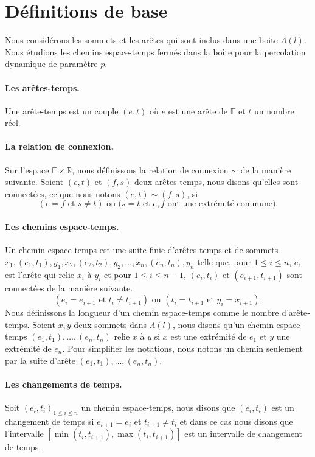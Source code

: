\documentclass[titlepage,a4paper,12pt]{article}
\newcounter{d}
\newcounter{t}
\newcounter{p}
\newcounter{c}
\newcounter{a}
\newcounter{l}
\begin{document}
\section{Définitions de base}
Nous considérons les sommets et les arêtes qui sont inclus dans une boite $\Lambda(l)$. Nous étudions les chemins espace-temps fermés dans la boîte pour la percolation dynamique de paramètre $p$.
\paragraph{Les arêtes-temps.}
Une arête-temps est un couple $(e,t)$ où $e$ est une arête de $\mathbb{E}$ et $t$ un nombre réel. 

\paragraph{La relation de connexion.} Sur l'espace $\mathbb{E}\times \mathbb{R}$, nous définissons la relation de connexion $\sim$ de la manière suivante. Soient $(e,t)$ et $(f,s)$ deux arêtes-temps, nous disons qu'elles sont connectées, ce que nous notons $(e,t)\sim(f,s)$, si $$(e=f \text{ et } s\neq t)\text{ ou (}s=t\text{ et }e,f\text{ ont une extrémité commune)}.$$
\paragraph{Les chemins espace-temps.} Un chemin espace-temps est une suite finie d'arêtes-temps et de sommets $x_1,(e_1,t_1),y_1,x_2,(e_2,t_2),y_2,\dots,x_{n},(e_n,t_n),y_n$ telle que, pour $1\leqslant i \leqslant n$, $e_i$ est l'arête qui relie $x_i$ à $y_i$ et pour $ 1\leqslant i \leqslant n-1$, $(e_i,t_i)$ et $(e_{i+1},t_{i+1})$ sont connectées de la manière suivante.
$$ (e_i = e_{i+1}\text{ et }t_i \neq t_{i+1})\text{ ou }(t_i = t_{i+1} \text{ et } y_i = x_{i+1})
.$$ Nous définissons la longueur d'un chemin espace-temps comme le nombre d'arête-temps. Soient $x,y$ deux sommets dans $\Lambda(l)$, nous disons qu'un chemin espace-temps $(e_1,t_1),\dots,(e_n,t_n)$ relie $x$ à $y$ si $x$ est une extrémité de $e_1$ et $y$ une extrémité de $e_n$. Pour simplifier les notations, nous notons un chemin seulement par la suite d'arête $(e_1,t_1),\dots,(e_n,t_n)$.
\paragraph{Les changements de temps.} Soit $(e_i,t_i)_{1\leqslant i \leqslant n}$ un chemin espace-temps, nous disons que $(e_i,t_i)$ est un changement de temps si $e_{i+1} = e_i$ et $t_{i+1}\neq t_i$ et dans ce cas nous disons que l'intervalle $[\min(t_i,t_{i+1}),\max(t_i,t_{i+1})]$ est un intervalle de changement de temps.
\end{document}
